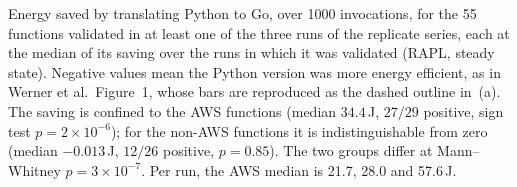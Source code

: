 \caption{Energy saved by translating Python to Go, over 1000 invocations, for the
  55 functions validated in at least one of the three runs of the replicate series, each at the median of its saving over the runs in which it was validated (RAPL, steady state). Negative values mean the Python version was more
  energy efficient, as in Werner et al.\ Figure~1, whose bars are reproduced as the
  dashed outline in~(a). The saving is confined to the AWS functions (median
  $34.4$\,J, $27/29$ positive, sign test $p=2 \times 10^{-6}$); for the non-AWS functions it
  is indistinguishable from zero (median $-0.013$\,J, $12/26$ positive,
  $p=0.85$). The two groups differ at Mann--Whitney $p=3 \times 10^{-7}$. Per run, the AWS median is 21.7, 28.0 and 57.6\,J.}
